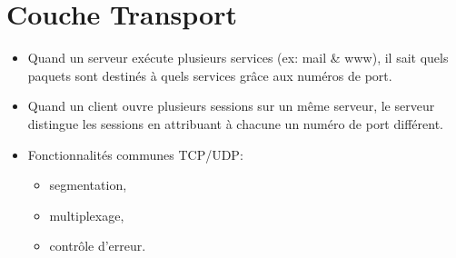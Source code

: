 \documentclass[a4paper]{article}
\begin{document}
\section{Couche Transport}





\begin{itemize}





\item Quand un serveur exécute plusieurs services (ex: mail \& www), il sait quels paquets sont destinés à quels services grâce aux numéros de port.





\item Quand un client ouvre plusieurs sessions sur un même serveur, le serveur distingue les sessions en attribuant à chacune un numéro de port différent.





\item Fonctionnalités communes TCP/UDP:
\begin{itemize}
    \item segmentation,
    \item multiplexage,
    \item contrôle d'erreur.
\end{itemize}






\end{itemize}
\end{document}
